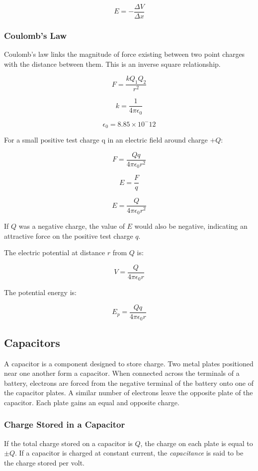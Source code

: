 \documentclass[12pt]{article}
\begin{document}
\[E = - \dfrac{\Delta V}{ \Delta x}\]

\subsubsection{Coulomb's Law}
\label{sec:org537b476}

Coulomb's law links the magnitude of force existing between two point charges with the distance between them. This is an inverse square relationship.

\[F = \dfrac{kQ_1Q_2}{r^2}\]

\[k = \dfrac{1}{4 \pi \epsilon_0}\]

\[\epsilon_0 = 8.85 \times 10^-12 \]

For a small positive test charge q in an electric field around charge \(+Q\):


\[F = \dfrac{Qq}{4 \pi \epsilon_0r^2}\]

\[E = \dfrac{F}{q}\]

\[E = \dfrac{Q}{4 \pi \epsilon_0r^2}\]

If \(Q\) was a negative charge, the value of \(E\) would also be negative, indicating an attractive force on the positive test charge \(q\).

The electric potential at distance \(r\) from \(Q\) is:

\[V = \dfrac{Q}{4 \pi \epsilon_0r}\]

The potential energy is:

\[E_p = \dfrac{Qq}{4 \pi \epsilon_0r}\]

\subsection{Capacitors}
\label{sec:org0dc5bf5}

A capacitor is a component designed to store charge. Two metal plates positioned near one another form a capacitor. When connected across the terminals of a battery, electrons are forced from the negative terminal of the battery onto one of the capacitor plates. A similar number of electrons leave the opposite plate of the capacitor. Each plate gains an equal and opposite charge.

\subsubsection{Charge Stored in a Capacitor}
\label{sec:org18dbd47}

If the total charge stored on a capacitor is \(Q\), the charge on each plate is equal to \(\pm Q\). If a capacitor is charged at constant current, the \emph{capacitance} is said to be the charge stored per volt.
\end{document}
